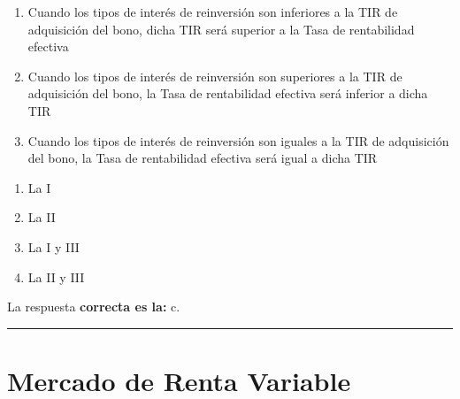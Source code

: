 \documentclass[
  letterpaper,
  DIV=11,
  numbers=noendperiod]{scrreprt}
\begin{document}
\begin{enumerate}
\def\labelenumi{\Roman{enumi}.}
\item
  Cuando los tipos de interés de reinversión son inferiores a la TIR de
  adquisición del bono, dicha TIR será superior a la Tasa de
  rentabilidad efectiva
\item
  Cuando los tipos de interés de reinversión son superiores a la TIR de
  adquisición del bono, la Tasa de rentabilidad efectiva será inferior a
  dicha TIR
\item
  Cuando los tipos de interés de reinversión son iguales a la TIR de
  adquisición del bono, la Tasa de rentabilidad efectiva será igual a
  dicha TIR
\end{enumerate}

\begin{enumerate}
\def\labelenumi{\alph{enumi}.}
\item
  La I
\item
  La II
\item
  La I y III
\item
  La II y III
\end{enumerate}

\begin{tcolorbox}[enhanced jigsaw, left=2mm, opacityback=0, colback=white, breakable, arc=.35mm, bottomrule=.15mm, rightrule=.15mm, toprule=.15mm, leftrule=.75mm, colframe=quarto-callout-tip-color-frame]
\begin{minipage}[t]{5.5mm}
\textcolor{quarto-callout-tip-color}{\faLightbulb}
\end{minipage}%
\begin{minipage}[t]{\textwidth - 5.5mm}

La respuesta \textbf{correcta es la:} c.

\end{minipage}%
\end{tcolorbox}

\begin{center}\rule{0.5\linewidth}{0.5pt}\end{center}

\hypertarget{mercado-de-renta-variable}{%
\section*{Mercado de Renta Variable}\label{mercado-de-renta-variable}}

\end{document}
